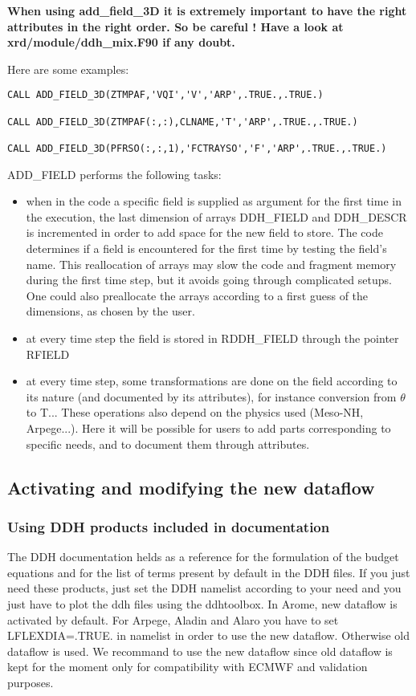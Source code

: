 \textbf{When using add\_field\_3D it is extremely important to have the right attributes in the right order.
So be careful ! Have a look at xrd/module/ddh\_mix.F90 if any doubt.}

Here are some examples:

\begin{verbatim}
CALL ADD_FIELD_3D(ZTMPAF,'VQI','V','ARP',.TRUE.,.TRUE.)

CALL ADD_FIELD_3D(ZTMPAF(:,:),CLNAME,'T','ARP',.TRUE.,.TRUE.)

CALL ADD_FIELD_3D(PFRSO(:,:,1),'FCTRAYSO','F','ARP',.TRUE.,.TRUE.)
\end{verbatim}

ADD\_FIELD performs the following tasks:

\begin{itemize}
\item when in the code a specific field is supplied as argument for the first time in the execution, the last dimension of arrays DDH\_FIELD and DDH\_DESCR
is incremented in order to add space for the new field to store. The code determines if a field is encountered for the first time by testing
the field's name. This reallocation of arrays may slow the code and fragment memory during the first time step, but it avoids going through complicated setups. One could also preallocate the arrays according to a first guess of the dimensions, as chosen by the user.
\item  at every time step the  field is stored in RDDH\_FIELD through the pointer RFIELD
\item at every time step, some transformations are done on the field according to its nature (and documented by its attributes), for instance conversion from $\theta$ to T... These operations also depend on the physics used (Meso-NH, Arpege...). Here it will be possible for users to add parts corresponding to specific needs, and to document them through attributes.
\end{itemize}






\subsection{Activating and modifying the new dataflow}


\subsubsection{Using DDH products included in documentation}
The DDH documentation helds as a reference for the formulation of the budget equations and for
the list of terms present by default in the DDH files. If you just need these products, just set the DDH
namelist according to your need and you just have to plot the ddh files using the ddhtoolbox.
In Arome, new dataflow is activated by default. For Arpege, Aladin and Alaro you have to set LFLEXDIA=.TRUE.
in namelist in order to use the new dataflow. Otherwise old dataflow is used. We recommand to use the
new dataflow since old dataflow is kept for the moment only for compatibility with ECMWF and 
validation purposes.

